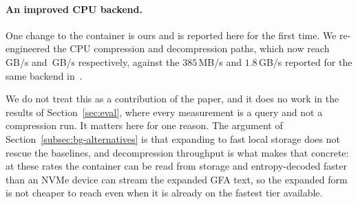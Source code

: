 \paragraph{An improved CPU backend.}
One change to the container is ours and is reported here for the first time. We
re-engineered the CPU compression and decompression paths, which now reach
\,GB/s and \,GB/s respectively, against the
$385$\,MB/s and $1.8$\,GB/s reported for the same backend
in~\cite{gfaz2026}.

We do not treat this as a contribution of the paper, and it does no work in the
results of Section~\ref{sec:eval}, where every \sys measurement is a query and
not a compression run. It matters here for one reason. The argument of
Section~\ref{subsec:bg-alternatives} is that expanding to fast local storage does
not rescue the baselines, and decompression throughput is what makes that
concrete: at these rates the container can be read from storage and
entropy-decoded faster than an NVMe device can stream the expanded GFA text,
so the expanded form is not cheaper to reach even when it is already on the
fastest tier available.
